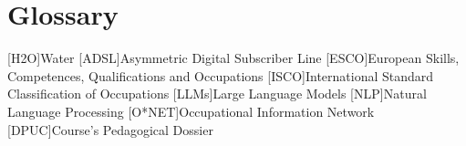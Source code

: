 \chapter{Glossary}

\footnotesize
\SingleSpacing

\begin{multicols}{2}
\begin{acronym}[AAAAAA]

	[H2O]{Water}
	[ADSL]{Asymmetric Digital Subscriber Line}
        [ESCO]{European Skills, Competences, Qualifications and Occupations}
        [ISCO]{International Standard Classification of Occupations}
        [LLMs]{Large Language Models}
        [NLP]{Natural Language Processing}
        [O*NET]{Occupational Information Network}
        [DPUC]{Course’s Pedagogical Dossier}
\end{acronym}
\end{multicols}